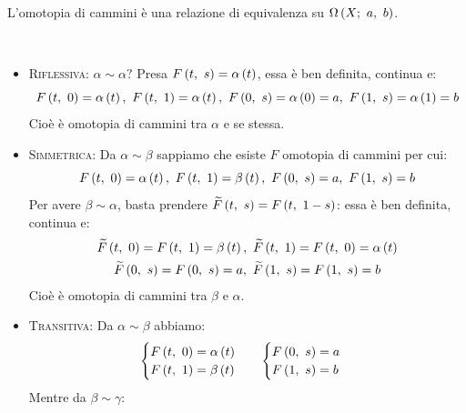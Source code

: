 \begin{observe}
	L'omotopia di cammini è una relazione di equivalenza su $\Omega\left(X;\ a,\ b\right)$.
\end{observe}
\begin{demonstration}~{}
		\begin{itemize}
		\item \textsc{Riflessiva}: $\alpha\sim \alpha ?$ Presa $F\left(t,\ s\right)=\alpha\left(t\right)$, essa è ben definita, continua e:
		\begin{equation*}
			\mvf{F}{t}{0}=\alpha\left(t\right),\ \mvf{F}{t}{1}=\alpha\left(t\right),\ \mvf{F}{0}{s}=\alpha\left(0\right)=a,\ \mvf{F}{1}{s}=\alpha\left(1\right)=b
		\end{equation*}
	Cioè è omotopia di cammini tra $\alpha$ e se stessa.
		\item \textsc{Simmetrica}: Da $\alpha\sim \beta$ sappiamo che esiste $F$ omotopia di cammini per cui:
		\begin{equation*}
			\mvf{F}{t}{0}=\alpha\left(t\right),\ \mvf{F}{t}{1}=\beta\left(t\right),\ \mvf{F}{0}{s}=a,\ \mvf{F}{1}{s}=b
		\end{equation*}
		Per avere $\beta\sim \alpha$, basta prendere $\widetilde{F}\left(t,\ s\right)=F\left(t,\ 1-s\right)$: essa è ben definita, continua e:
		\begin{gather*}
			\mvf{\widetilde{F}}{t}{0}=\mvf{F}{t}{1}=\beta\left(t\right),\ \mvf{\widetilde{F}}{t}{1}=\mvf{F}{t}{0}=\alpha\left(t\right)\\ \mvf{\widetilde{F}}{0}{s}=\mvf{F}{0}{s}=a,\ \mvf{\widetilde{F}}{1}{s}=\mvf{F}{1}{s}=b
		\end{gather*}
		Cioè è omotopia di cammini tra $\beta$ e $\alpha$.
		\item \textsc{Transitiva}: Da $\alpha\sim \beta$ abbiamo:
	\begin{equation*}
			\begin{array}{ll}
			\begin{cases}
				F\left(t,\ 0\right)=\alpha\left(t\right)\\
				F\left(t,\ 1\right)=\beta\left(t\right)
			\end{cases}&
		\begin{cases}
				F\left(0,\ s\right)=a\\
				F\left(1,\ s\right)=b
		\end{cases}
			\end{array}
	\end{equation*}
Mentre da $\beta\sim \gamma$:
	\begin{equation*}
	\begin{array}{ll}

\end{array}
\end{equation*}
\end{itemize}
\end{demonstration}
